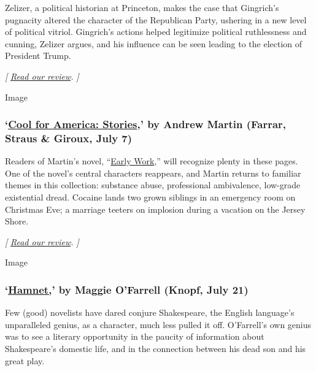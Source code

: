 Zelizer, a political historian at Princeton, makes the case that
Gingrich's pugnacity altered the character of the Republican Party,
ushering in a new level of political vitriol. Gingrich's actions helped
legitimize political ruthlessness and cunning, Zelizer argues, and his
influence can be seen leading to the election of President Trump.

\emph{{[}}
\href{https://www.nytimes3xbfgragh.onion/2020/07/04/books/review-burning-down-house-newt-gingrich-julian-zelizer.html}{\emph{Read
our review}}\emph{. {]}}

Image

\hypertarget{cool-for-america-stories-by-andrew-martin-farrar-straus--giroux-july-7}{%
\subsubsection{\texorpdfstring{`\href{https://us.macmillan.com/books/9780374108168}{Cool
for America: Stories},' by Andrew Martin (Farrar, Straus \& Giroux, July
7)}{`Cool for America: Stories,' by Andrew Martin (Farrar, Straus \& Giroux, July 7)}}\label{cool-for-america-stories-by-andrew-martin-farrar-straus--giroux-july-7}}

Readers of Martin's novel,
``\href{https://www.nytimes3xbfgragh.onion/2018/07/25/books/review/andrew-martin-early-work.html}{Early
Work},'' will recognize plenty in these pages. One of the novel's
central characters reappears, and Martin returns to familiar themes in
this collection: substance abuse, professional ambivalence, low-grade
existential dread. Cocaine lands two grown siblings in an emergency room
on Christmas Eve; a marriage teeters on implosion during a vacation on
the Jersey Shore.

\emph{{[}}
\href{https://www.nytimes3xbfgragh.onion/2020/07/07/books/review/cool-for-america-andrew-martin.html}{\emph{Read
our review}}\emph{. {]}}

Image

\hypertarget{hamnet-by-maggie-ofarrell-knopf-july-21}{%
\subsubsection{\texorpdfstring{`\href{https://www.penguinrandomhouse.com/books/612385/hamnet-by-maggie-ofarrell/}{Hamnet,}'
by Maggie O'Farrell (Knopf, July
21)}{`Hamnet,' by Maggie O'Farrell (Knopf, July 21)}}\label{hamnet-by-maggie-ofarrell-knopf-july-21}}

Few (good) novelists have dared conjure Shakespeare, the English
language's unparalleled genius, as a character, much less pulled it off.
O'Farrell's own genius was to see a literary opportunity in the paucity
of information about Shakespeare's domestic life, and in the connection
between his dead son and his great play.

